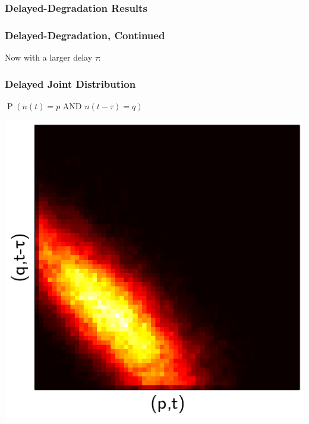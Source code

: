 \documentclass[xcolor={usenames,dvipsnames,svgnames}]{beamer}
\DeclareMathOperator{\Prob}{P}
\begin{document}
\begin{frame}
    \frametitle{Delayed-Degradation Results}
    \begin{center}
        \resizebox{0.48\textwidth}{!}{
            
        }
        \resizebox{0.48\textwidth}{!}{
            
        }
    \end{center}
\end{frame}

\begin{frame}
    \frametitle{Delayed-Degradation, Continued}
    Now with a larger delay $\tau$:

    \begin{center}
        \resizebox{0.48\textwidth}{!}{
            
        }
        \resizebox{0.48\textwidth}{!}{
            
        }
    \end{center}
\end{frame}

\begin{frame}
    \frametitle{Delayed Joint Distribution}
    \begin{center}
        $\Prob \left(n(t) = p \text{ AND } n(t - \tau) = q \right)$

        \includegraphics[height=0.6\textheight]{../results/presentation/ddjd-a100-c3.png}
    \end{center}
\end{frame}
\end{document}
